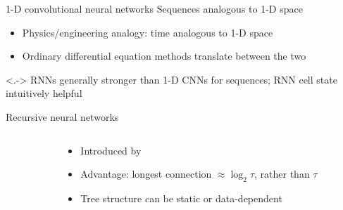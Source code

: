 \begin{frame}{1-D convolutional neural networks}
    Sequences analogous to 1-D space
    \begin{itemize}
        \item<+-> Physics/engineering analogy: time analogous to 1-D space
        \item Ordinary differential equation methods translate between the two
    \end{itemize}

    \begin{center}
        

    \end{center}

    \uncover<.->{
        RNN{}s generally stronger than 1-D CNN{}s for sequences;
        RNN{} cell state intuitively helpful
    }
\end{frame}

\begin{frame}{Recursive neural networks}
    \begin{columns}
        \begin{column}{0.61\textwidth}
            
        \end{column}
        \begin{column}{0.39\textwidth}
            \begin{itemize}
                \item Introduced by \citet{PollackAI90}
                \item Advantage: longest connection $\approx \log_2 \tau$, rather than $\tau$
                \item Tree structure can be static or data-dependent
            \end{itemize}
        \end{column}
    \end{columns}
\end{frame}

